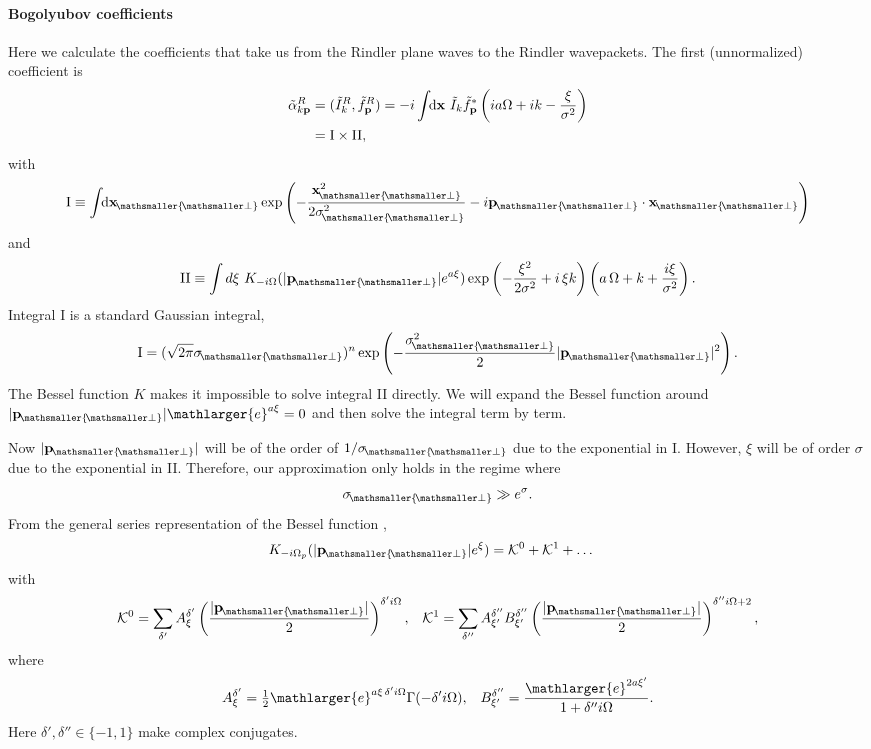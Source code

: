 \documentclass[11pt, a4paper]{article}
\def\bx{{\bf x}}
\def\bp{{\bf p}}
\newcommand{\Om}{\Omega}
\newcommand{\al}{\alpha}
\newcommand{\si}{{\sigma}}
\newcommand{\sfrac}[2]{{\textstyle\frac{#1}{#2}}}
\newcommand{\half}{\sfrac{1}{2}}
\newcommand{\nn}{\nonumber}
\newcommand{\integral}{\int\!\! \mathrm{d}}
\let\perptmp\perp
\renewcommand{\perp}{{\! \mathsmaller{\perptmp}}}
\newcommand{\e}{\mathlarger{e}}
\begin{document}
\paragraph{Bogolyubov coefficients}
Here we calculate the coefficients that take us from the Rindler plane waves to the Rindler wavepackets. The first (unnormalized) coefficient is
\begin{align*}
\tilde \al^R_{k\bp}&=(\tilde I^R_k,\tilde f^R_{\bp})=-i \integral \bx\ \tilde I_k \tilde f_\bp^*\left(ia\Om+i k-\frac{\xi}{\si ^2}\right)\nn\\
&=\mathrm{I}\times \mathrm{II},
\end{align*}
with
\begin{align*}
\mathrm{I}\equiv\integral \bx_\perp \exp\left({-\frac{\bx^2_\perp}{2\sigma_\perp^2}-i \bp_\perp\cdot \bx_\perp}\right)
\end{align*}
and
\begin{align*}
\mathrm{II}\equiv\int d\xi\ K_{-i \Om} (|\mathbf p_\perp|e^{a\xi} ) \exp{\left(-\frac{\xi ^2}{2  \si^2}+i\,\xi  k\right) }\left(a\,\Om+k+\frac{i \xi }{\si^2}\right).
\end{align*}
Integral I is a standard Gaussian integral,
\begin{align*}
\mathrm{I}=(\sqrt{2\pi}\si_\perp)^n\exp\left(-\frac{\si^2_\perp}{2}|\bp_\perp|^2\right).
\end{align*}
The Bessel function $K$ makes it impossible to solve integral II directly.  We will expand the Bessel function around $|\bp_\perp|\e^{a\xi} =0$ and then solve the integral term by term. 

 Now $|\bp_\perp|$ will be of the order of $1/\si_\perp$ due to the exponential in I. However, $\xi$ will be of order $\si$ due to the exponential in II. Therefore, our approximation only holds in the regime  where
\begin{align*}
\si_\perp\gg e^\si .
\end{align*}
From the general series representation of the Bessel function \cite{Wolfram}, 
\begin{align*}
K_{-i\Om_p}(|\mathbf p_\perp|e^{\xi} )&= \mathcal K^0+\mathcal K^1+\ldots
\end{align*}
with
\begin{align}
\mathcal K^0=\sum_{\delta'}A^{\delta'}_\xi\left(\frac{|\bp_\perp|}{2}\right)^{\delta'i\Om}, &&
\mathcal K^1= \sum_{\delta''}A^{\delta''}_{\xi'}B^{\delta''}_{\xi'}\left(\frac{|\bp_\perp|}{2}\right)^{\delta''i\Om+2},
\end{align}
where
\begin{align}
\label{eq:calcAandB}
A^{\delta'}_\xi=\half \e^{a\xi\, \delta'i \Om}\Gamma(-\delta'i\Om), &&
B^{\delta''}_{\xi'}=\frac{\e^{2a\xi'}}{1+\delta''i\Om}.
\end{align}
Here  $\delta', \delta''\in\{-1,1\}$ make complex conjugates. 
\end{document}
